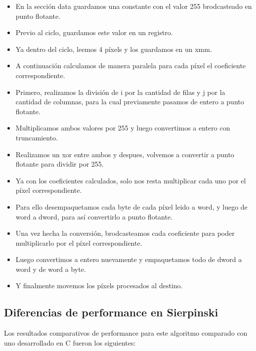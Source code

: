 \documentclass[a4paper]{article}
\begin{document}
\begin{itemize}
\item En la sección data guardamos una constante con el valor 255 brodcasteado en punto flotante.
\item Previo al ciclo, guardamos este valor en un registro.
\item Ya dentro del ciclo, leemos 4 píxels y los guardamos en un xmm.
\item A continuación calculamos de manera paralela para cada píxel el coeficiente correspondiente.
\item Primero, realizamos la división de i por la cantidad de filas y j por la cantidad de columnas, para la cual previamente pasamos de entero a punto flotante.
\item Multiplicamos ambos valores por 255 y luego convertimos a entero con truncamiento.
\item Realizamos un xor entre ambos y despues, volvemos a convertir a punto flotante para dividir por 255.
\item Ya con los coeficientes calculados, solo nos resta multiplicar cada uno por el píxel correspondiente.
\item Para ello desempaquetamos cada byte de cada píxel leido a word, y luego de word a dword, para así convertirlo a punto flotante.
\item Una vez hecha la conversión, brodcasteamos cada coeficiente para poder multiplicarlo por el píxel correspondiente.
\item Luego convertimos a entero nuevamente y empaquetamos todo de dword a word y de word a byte.
\item Y finalmente movemos los píxels procesados al destino.
\end{itemize}

\subsection{Diferencias de performance en Sierpinski}

Los resultados comparativos de performance para este algoritmo comparado con uno desarrollado en C fueron los siguientes:

\newpage
\end{document}

